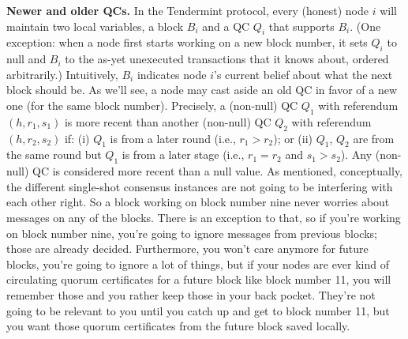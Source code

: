 \noindent
\textbf{Newer and older QCs.} 
In the Tendermint protocol, every (honest) node $i$ will maintain
two local variables, a block $B_i$ and a QC $Q_i$ that supports $B_i$. (One exception: when a node first starts working on a new block number, it sets $Q_i$ to null and $B_i$ to the as-yet unexecuted transactions that it knows about, ordered arbitrarily.) Intuitively, $B_i$ indicates node $i$’s current belief about what the next block should be.
As we’ll see, a node may cast aside an old QC in favor of a new one (for the same
block number). Precisely, a (non-null) QC $Q_1$ with referendum $(h, r_1, s_1)$ is more recent than
another (non-null) QC $Q_2$ with referendum $(h, r_2, s_2)$ if: (i) $Q_1$ is from a later round (i.e.,
$r_1 > r_2$); or (ii) $Q_1$, $Q_2$ are from the same round but $Q_1$ is from a later stage (i.e., $r_1 = r_2$
and $s_1 > s_2$). Any (non-null) QC is considered more recent than a null value. As mentioned, conceptually, the different single-shot
consensus instances are not going to be interfering with each other right. So a block working on block number nine never worries about messages on any of
the blocks. There is an exception to that, so if you're working on block number nine, you're going to ignore messages from previous blocks; those are
already decided. Furthermore, you won't care anymore for future blocks, you're going to ignore a lot of things, but if your nodes are ever
kind of circulating quorum certificates for a future block like block number 11, you will
remember those and you rather keep those in your back pocket. They're not going to be relevant to you until you 
catch up and get to block number 11, but you want those quorum certificates from the future block saved locally.

